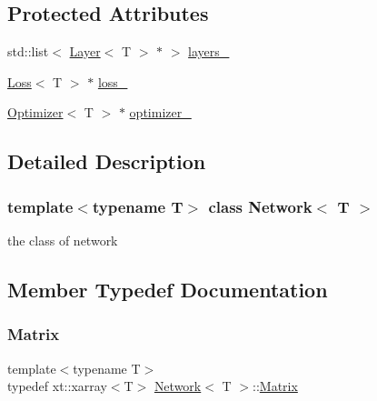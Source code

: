 \subsection*{Protected Attributes}
\begin{DoxyCompactItemize}
\item 
std\+::list$<$ \mbox{\hyperlink{class_layer}{Layer}}$<$ T $>$ $\ast$ $>$ \mbox{\hyperlink{class_network_a44ed9431544add6652254104c3413d4c}{layers\+\_\+}}
\item 
\mbox{\hyperlink{class_loss}{Loss}}$<$ T $>$ $\ast$ \mbox{\hyperlink{class_network_a1445c84bc4a3f14a71e982c1c2bef76d}{loss\+\_\+}}
\item 
\mbox{\hyperlink{class_optimizer}{Optimizer}}$<$ T $>$ $\ast$ \mbox{\hyperlink{class_network_a41e9d6851a95074ffec5e66b78deb9b7}{optimizer\+\_\+}}
\end{DoxyCompactItemize}


\subsection{Detailed Description}
\subsubsection*{template$<$typename T$>$\newline
class Network$<$ T $>$}

the class of network 



\subsection{Member Typedef Documentation}
\mbox{\label{class_network_a3217727df6a4bde68fb686293258d7f6}} 
\subsubsection{\texorpdfstring{Matrix}{Matrix}}
{\footnotesize\ttfamily template$<$typename T$>$ \\
typedef xt\+::xarray$<$T$>$ \mbox{\hyperlink{class_network}{Network}}$<$ T $>$\+::\mbox{\hyperlink{class_network_a3217727df6a4bde68fb686293258d7f6}{Matrix}}}

\mbox{\label{class_network_a581bef0355faccb9e6a4d4325792ec25}} 
